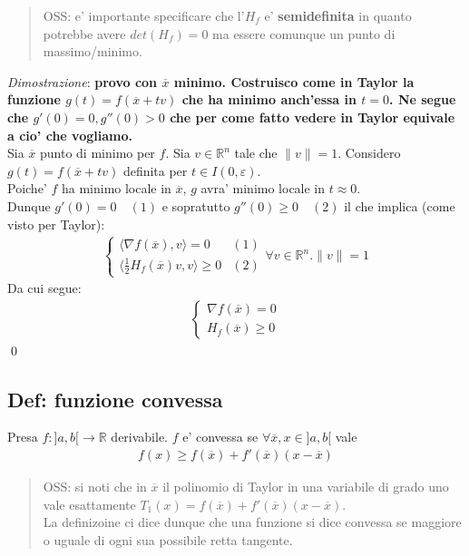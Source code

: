 \documentclass{article}
\begin{document}
\begin{quote}
  OSS: e' importante specificare che l'$H_f$ e' \textbf{semidefinita} in quanto
  potrebbe avere $det(H_f) = 0$ ma essere comunque un punto di massimo/minimo.
\end{quote}

\noindent \emph{Dimostrazione}: \textbf{provo con $\overline{x}$ minimo. Costruisco
come in Taylor la funzione $g(t) = f(\overline{x} + tv)$ che ha minimo anch'essa in
$t=0$. Ne segue che $g'(0) = 0, g''(0) > 0$ che per come fatto vedere in Taylor
equivale a cio' che vogliamo.} \\
Sia $\overline{x}$ punto di minimo per $f$. Sia $v \in \mathbb{R}^n$ tale che $\|v\|=1$.
Considero $g(t) = f(\overline{x} + tv)$ definita per $t \in I(0, \varepsilon)$. \\
Poiche' $f$ ha minimo locale in $\overline{x}$, $g$ avra' minimo locale in $t \approx 0$. \\
Dunque $g'(0) = 0 \quad (1)$ e sopratutto $g''(0) \geq 0 \quad (2)$ il che implica (come visto per Taylor):
\begin{align*}
  \begin{cases}
    \langle \nabla f(\overline{x}), v \rangle = 0 & (1)\\
    \langle \frac{1}{2} H_f(\overline{x}) v, v \rangle \geq 0 & (2)
  \end{cases} \forall v \in \mathbb{R}^n. \|v\|=1
\end{align*}
Da cui segue:
\begin{align*}
  \begin{cases}
    \nabla f(\overline{x}) = 0 \\
    H_f(\overline{x}) \geq 0
  \end{cases}
\end{align*}
\qed

\subsection{Def: funzione convessa}

Presa $f: ]a,b[ \to \mathbb{R}$ derivabile. $f$ e' convessa se $\forall \overline{x},
x \in ]a,b[$ vale 
\begin{align*}
  f(x) \geq f(\overline{x}) + f'(\overline{x}) (x-\overline{x})
\end{align*}

\begin{quote}
  OSS: si noti che in $\overline{x}$ il polinomio di Taylor in una variabile di
  grado uno vale esattamente $T_1(x) = f(\overline{x}) + f'(\overline{x}) (x-\overline{x})$. \\
  La definizoine ci dice dunque che una funzione si dice convessa se maggiore o
  uguale di ogni sua possibile retta tangente.
\end{quote}
\end{document}
